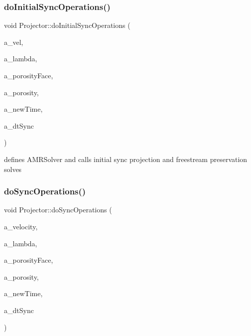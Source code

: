 \subsubsection{\texorpdfstring{do\+Initial\+Sync\+Operations()}{doInitialSyncOperations()}}
{\footnotesize\ttfamily void Projector\+::do\+Initial\+Sync\+Operations (\begin{DoxyParamCaption}\item[{\textbf{ Vector}$<$ \textbf{ Level\+Data}$<$ \textbf{ F\+Array\+Box} $>$ $\ast$ $>$ \&}]{a\+\_\+vel,  }\item[{\textbf{ Vector}$<$ \textbf{ Level\+Data}$<$ \textbf{ F\+Array\+Box} $>$ $\ast$ $>$ \&}]{a\+\_\+lambda,  }\item[{\textbf{ Vector}$<$ \textbf{ Ref\+Counted\+Ptr}$<$ \textbf{ Level\+Data}$<$ \textbf{ Flux\+Box} $>$ $>$ $>$ \&}]{a\+\_\+porosity\+Face,  }\item[{\textbf{ Vector}$<$ \textbf{ Ref\+Counted\+Ptr}$<$ \textbf{ Level\+Data}$<$ \textbf{ F\+Array\+Box} $>$ $>$ $>$ \&}]{a\+\_\+porosity,  }\item[{const \textbf{ Real}}]{a\+\_\+new\+Time,  }\item[{const \textbf{ Real}}]{a\+\_\+dt\+Sync }\end{DoxyParamCaption})}

defines A\+M\+R\+Solver and calls initial sync projection and freestream preservation solves \mbox{\label{class_projector_a0e127be31f7058f463334ba5c40eaef5}} 
\subsubsection{\texorpdfstring{do\+Sync\+Operations()}{doSyncOperations()}}
{\footnotesize\ttfamily void Projector\+::do\+Sync\+Operations (\begin{DoxyParamCaption}\item[{\textbf{ Vector}$<$ \textbf{ Level\+Data}$<$ \textbf{ F\+Array\+Box} $>$ $\ast$ $>$ \&}]{a\+\_\+velocity,  }\item[{\textbf{ Vector}$<$ \textbf{ Level\+Data}$<$ \textbf{ F\+Array\+Box} $>$ $\ast$ $>$ \&}]{a\+\_\+lambda,  }\item[{\textbf{ Vector}$<$ \textbf{ Ref\+Counted\+Ptr}$<$ \textbf{ Level\+Data}$<$ \textbf{ Flux\+Box} $>$ $>$ $>$ \&}]{a\+\_\+porosity\+Face,  }\item[{\textbf{ Vector}$<$ \textbf{ Ref\+Counted\+Ptr}$<$ \textbf{ Level\+Data}$<$ \textbf{ F\+Array\+Box} $>$ $>$ $>$ \&}]{a\+\_\+porosity,  }\item[{const \textbf{ Real}}]{a\+\_\+new\+Time,  }\item[{const \textbf{ Real}}]{a\+\_\+dt\+Sync }\end{DoxyParamCaption})}



